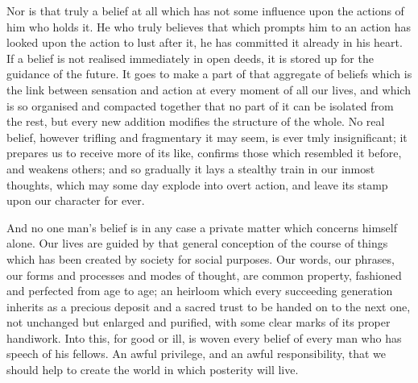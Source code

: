 \documentclass[12pt]{article}
\begin{document}
Nor is that truly a belief at all which has not some influence upon the actions of him who holds it. He who truly believes that which prompts him to an action has looked upon the action to lust after it, he has committed it already in his heart. If a belief is not realised immediately in open deeds, it is stored up for the guidance of the future. It goes to make a part of that aggregate of beliefs which is the link between sensation and action at every moment of all our lives, and which is so organised and compacted together that no part of it can be isolated from the rest, but every new addition modifies the structure of the whole. No real belief, however trifling and fragmentary it may seem, is ever tmly insignificant; it prepares us to receive more of its like, confirms those which resembled it before, and weakens others; and so gradually it lays a stealthy train in our inmost thoughts, which may some day explode into overt action, and leave its stamp upon our character for ever.

And no one man's belief is in any case a private matter which concerns himself alone. Our lives are guided by that general conception of the course of things which has been created by society for social purposes. Our words, our phrases, our forms and processes and modes of thought, are common property, fashioned and perfected from age to age; an heirloom which every succeeding generation inherits as a precious deposit and a sacred trust to be handed on to the next one, not unchanged but enlarged and purified, with some clear marks of its proper handiwork. Into this, for good or ill, is woven every belief of every man who has speech of his fellows. An awful privilege, and an awful responsibility, that we should help to create the world in which posterity will live.
\end{document}

